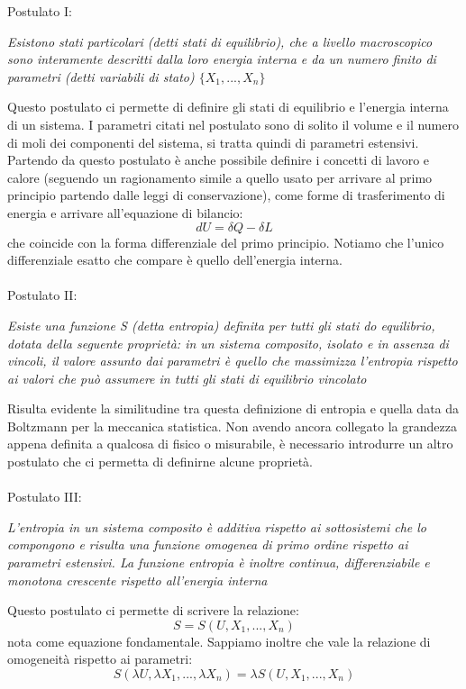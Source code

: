 \documentclass{article}
\begin{document}
Postulato I:
\begin{center}
    \textit{Esistono stati particolari (detti stati di equilibrio), che a livello macroscopico sono interamente descritti dalla loro energia interna e da un numero finito di parametri (detti variabili di stato) $\{ X_1,...,X_n \}$}
\end{center}
Questo postulato ci permette di definire gli stati di equilibrio e l'energia interna di un sistema. I parametri citati nel postulato sono di solito il volume e il numero di moli dei componenti del sistema, si tratta quindi di parametri estensivi. Partendo da questo postulato è anche possibile definire i concetti di lavoro e calore (seguendo un ragionamento simile a quello usato per arrivare al primo principio partendo dalle leggi di conservazione), come forme di trasferimento di energia e arrivare all'equazione di bilancio:
$$ dU = \delta Q -\delta L $$
che coincide con la forma differenziale del primo principio. Notiamo che l'unico differenziale esatto che compare è quello dell'energia interna.\\\\
Postulato II:
\begin{center}
    \textit{Esiste una funzione S (detta entropia) definita per tutti gli stati do equilibrio, dotata della seguente proprietà: in un sistema composito, isolato e in assenza di vincoli, il valore assunto dai parametri è quello che massimizza l'entropia rispetto ai valori che può assumere in tutti gli stati di equilibrio vincolato}
\end{center}
Risulta evidente la similitudine tra questa definizione di entropia e quella data da Boltzmann per la meccanica statistica. Non avendo ancora collegato la grandezza appena definita a qualcosa di fisico o misurabile, è necessario introdurre un altro postulato che ci permetta di definirne alcune proprietà.\\\\
Postulato III:
\begin{center}
    \textit{L'entropia in un sistema composito è additiva rispetto ai sottosistemi che lo compongono e risulta una funzione omogenea di primo ordine rispetto ai parametri estensivi. La funzione entropia è inoltre continua, differenziabile e monotona crescente rispetto all'energia interna}
\end{center}
Questo postulato ci permette di scrivere la relazione:
$$ S = S(U, X_1, ..., X_n) $$
nota come equazione fondamentale. Sappiamo inoltre che vale la relazione di omogeneità rispetto ai parametri:
$$ S(\lambda U, \lambda X_1, ..., \lambda X_n) = \lambda S(U, X_1, ..., X_n) $$
\end{document}
